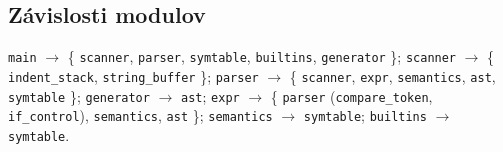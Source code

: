 \subsection{Závislosti modulov}
\begin{center}
\texttt{main} $\rightarrow$ \{ \texttt{scanner}, \texttt{parser}, \texttt{symtable}, \texttt{builtins}, \texttt{generator} \}; \quad \texttt{scanner} $\rightarrow$ \{ \texttt{indent\_stack}, \texttt{string\_buffer} \}; \quad \texttt{parser} $\rightarrow$ \{ \texttt{scanner}, \texttt{expr}, \texttt{semantics}, \texttt{ast}, \texttt{symtable} \}; \quad \texttt{generator} $\rightarrow$ \texttt{ast}; \quad \texttt{expr} $\rightarrow$ \{ \texttt{parser} (\texttt{compare\_token}, \texttt{if\_control}), \texttt{semantics}, \texttt{ast} \}; \quad \texttt{semantics} $\rightarrow$ \texttt{symtable}; \quad \texttt{builtins} $\rightarrow$ \texttt{symtable}.
\end{center}